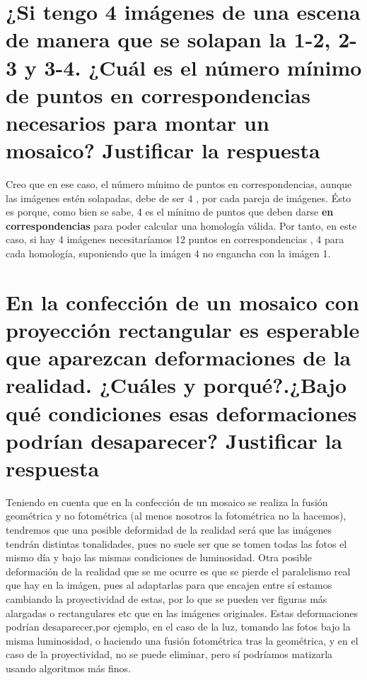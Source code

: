 \section{¿Si tengo 4 imágenes de una escena de manera que se solapan la 1-2, 2-3
y 3-4. ¿Cuál es el número mínimo de puntos en correspondencias necesarios para
montar un mosaico? Justificar la respuesta}
Creo que en ese caso, el número mínimo de puntos en correspondencias, aunque las imágenes estén solapadas, debe de ser
4 , por cada pareja de imágenes. Ésto es porque, como bien se sabe, 4 es el mínimo de puntos que deben darse \textbf{en correspondencias}
para poder calcular una homología válida. Por tanto, en este caso, si hay 4 imágenes necesitaríamos 12 puntos en correspondencias , 4 para
cada homología, suponiendo que la imágen 4 no engancha con la imágen 1.
\section{En la confección de un mosaico con proyección rectangular es esperable
que aparezcan deformaciones de la realidad. ¿Cuáles y porqué?.¿Bajo qué
condiciones esas deformaciones podrían desaparecer? Justificar la respuesta}
Teniendo en cuenta que en la confección de un mosaico se realiza la fusión geométrica y no fotométrica (al menos nosotros
la fotométrica no la hacemos), tendremos que una posible deformidad de la realidad será que las imágenes tendrán distintas tonalidades, pues
no suele ser que se tomen todas las fotos el mismo día y bajo las mismas condiciones de luminosidad. \newline
Otra posible deformación de la realidad que se me ocurre es que se pierde el paralelismo real que hay en la imágen, pues al adaptarlas
para que encajen entre sí estamos cambiando la proyectividad de estas, por lo que se pueden ver figuras más alargadas o rectangulares etc
que en las imágenes originales. \newline
Estas deformaciones podrían desaparecer,por ejemplo, en el caso de la luz, tomando las fotos bajo la misma luminosidad, o haciendo
una fusión fotométrica tras la geométrica, y en el caso de la proyectividad, no se puede eliminar, pero sí podríamos matizarla usando algoritmos más finos.  


